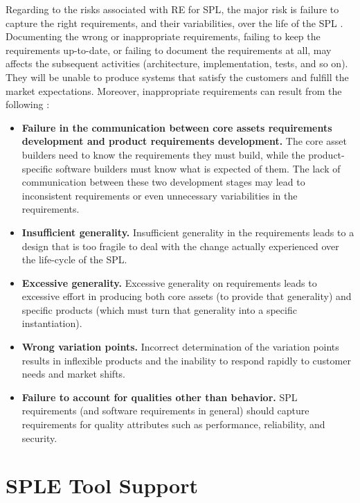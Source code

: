 Regarding to the risks associated with \ac{RE} for \ac{SPL}, the major risk is failure to
capture the right requirements, and their variabilities, over the life of the \ac{SPL} 
\citep{clements2002software}. Documenting the wrong or inappropriate
requirements, failing to keep the requirements up-to-date, or failing to document the requirements at all, 
may affects the subsequent activities (architecture, implementation, tests, and so  on). They will 
be unable to produce systems that satisfy the customers and fulfill the market expectations. 
Moreover, inappropriate requirements can result from the  following
\citep{clements2002software}:

\begin{itemize}
\item \textbf{Failure in the communication between core assets requirements
development and product requirements development.} The core asset builders need to 
know the requirements they must build, while the product-specific software builders 
must know what is expected of them. The lack of communication between these two development 
stages may lead to inconsistent requirements or even unnecessary variabilities
in the requirements.
\item \textbf{Insufficient generality.} Insufficient generality in the
requirements leads to a design that is too fragile to deal with the change actually experienced 
over the life-cycle of  the \ac{SPL}.
\item \textbf{Excessive generality.} Excessive generality on requirements leads
to excessive effort in producing both core assets (to provide that generality) and specific 
products (which must turn that generality into a specific instantiation).
\item \textbf{Wrong variation points.} Incorrect determination of the variation
points results in inflexible products and the inability to respond rapidly to customer needs and market shifts.
\item \textbf{Failure to account for qualities other than behavior.} \ac{SPL}
requirements (and software requirements in general) should capture requirements for quality 
attributes such as performance, reliability, and security.
\end{itemize}

\section{SPLE Tool Support}
\label{sc:spltools}

